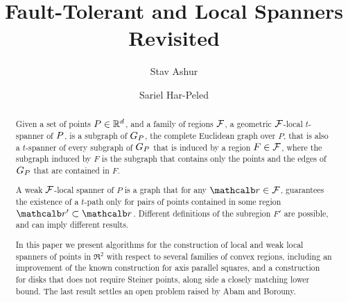 \documentclass[12pt]{article}%
\begin{document}
\title{Fault-Tolerant and Local Spanners Revisited}
	
\author{%
   Stav Ashur%
   \StavThanks{}%
   \and%
   Sariel Har-Peled%
}%
	
\maketitle



\begin{abstract}
	
    Given a set of points $P\in \mathbb{R}^d $, and a family of regions
    $\mathcal{F}$, a geometric $\mathcal{F}$-local $t$-spanner of $P$, is a subgraph
    of $G_P$, the complete Euclidean graph over $P$, that is also a
    $t$-spanner of every subgraph of $G_P$ that is induced by a
    region $F\in \mathcal{F}$, where the subgraph induced by $F$ is the
    subgraph that contains only the points and the edges of $G_P$
    that are contained in $F$.
	
	
    A weak $\mathcal{F}$-local spanner of $P$ is a graph that for any
    $\region\in\FF$, guarantees the existence of a $t$-path only for
    pairs of points contained in some region
    $\region'\subset \region$. Different definitions of the subregion
    $F'$ are possible, and can imply different results.
	
    In this paper we present algorithms for the construction of local
    and weak local spanners of points in $\Re^2$ with respect to
    several families of convex regions, including an improvement of
    the known construction for axis parallel squares, and a
    construction for disks that does not require Steiner points, along
    side a closely matching lower bound. The last result settles an
    open problem raised by Abam and Borouny.
\end{abstract}
\end{document}
